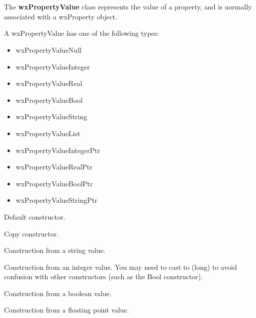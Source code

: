 \section{}\label{wxpropertyvalue}

The {\bf wxPropertyValue} class represents the value of a property,
and is normally associated with a wxProperty object.

A wxPropertyValue has one of the following types:

\begin{itemize}\itemsep=0pt
\item wxPropertyValueNull
\item wxPropertyValueInteger
\item wxPropertyValueReal
\item wxPropertyValueBool
\item wxPropertyValueString
\item wxPropertyValueList
\item wxPropertyValueIntegerPtr
\item wxPropertyValueRealPtr
\item wxPropertyValueBoolPtr
\item wxPropertyValueStringPtr
\end{itemize}



Default constructor.


Copy constructor.


Construction from a string value.


Construction from an integer value. You may need to cast to (long) to
avoid confusion with other constructors (such as the Bool constructor).


Construction from a boolean value.


Construction from a floating point value.


